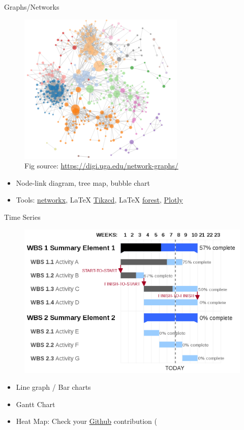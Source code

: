 \documentclass{../TexTemplate/myslide}
\begin{document}
\begin{frame}{Graphs/Networks}
\begin{figure}
\centering
\includegraphics[width=0.4\linewidth]{fig/network_graphs.png}
\caption*{\small Fig source: \url{https://digi.uga.edu/network-graphs/}}
\end{figure}
\begin{itemize}
	\item Node-link diagram, tree map, bubble chart
	\item Tools: \href{https://networkx.github.io/}{networkx}, \LaTeX{} \href{http://ctan.math.washington.edu/tex-archive/graphics/pgf/contrib/tikz-cd/tikz-cd-doc.pdf}{Tikzcd}, \LaTeX{} \href{http://mirrors.ibiblio.org/CTAN/graphics/pgf/contrib/forest/forest-doc.pdf}{forest}, \href{https://plot.ly/}{Plotly}
\end{itemize}
\end{frame}

\begin{frame}{Time Series}
\begin{figure}
\centering
\includegraphics[width=0.7\linewidth]{fig/Gantt_graph.png}
\end{figure}
\begin{itemize}
	\item Line graph / Bar charts
	\item Gantt Chart
	\item Heat Map: Check your \href{https://github.com/}{Github} contribution (
\end{itemize}
\end{frame}
\end{document}
